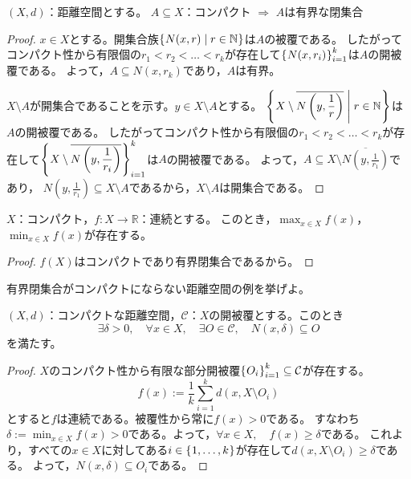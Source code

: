 \documentclass[uplatex]{jsarticle}
\begin{document}
\begin{hodai}
  $(X, d)$：距離空間とする。
  $A \subseteq X$：コンパクト $\Longrightarrow$ $A$は有界な閉集合
\end{hodai}

\begin{proof}
   $x \in X$とする。開集合族$\Set{\hspace{-1.8pt} N(x,r) | r \in \mathbb{N} \hspace{-1.8pt}}$は$A$の被覆である。
  したがってコンパクト性から有限個の$r_{1} < r_{2} < \dots < r_{k}$が存在して$\Set{\hspace{-1.8pt} N(x,r_{i}) \hspace{-1.8pt}}_{i=1}^{k}$は$A$の開被覆である。
  よって，$A \subseteq N(x,r_{k})$であり，$A$は有界。

   $X \setminus A$が開集合であることを示す。$y \in X \setminus A$とする。
  ${\displaystyle \Set{\hspace{-1.8pt} X \setminus \overline{N \left( y, \frac{1}{r} \right)} | r \in \mathbb{N} \hspace{-1.8pt}}}$は$A$の開被覆である。
  したがってコンパクト性から有限個の$r_{1} < r_{2} < \dots < r_{k}$が存在して${\displaystyle \Set{\hspace{-1.8pt} X \setminus \overline{N \left( y,\frac{1}{r_{i}} \right)} \hspace{-1.8pt}}_{i=1}^{k}}$は$A$の開被覆である。
  よって，${\displaystyle A \subseteq X \setminus \overline{N \left( y,\frac{1}{r_{1}} \right)}}$であり，
  ${\displaystyle N \left( y, \frac{1}{r_{1}} \right) \subseteq X \setminus A}$であるから，$X \setminus A$は開集合である。
\end{proof}

\begin{corr}
  $X$：コンパクト，$f \colon X \longrightarrow \mathbb{R}$：連続とする。
  このとき，${\displaystyle \max_{x \in X} f(x)}$，${\displaystyle \min_{x \in X} f(x)}$が存在する。
\end{corr}

\begin{proof}
  $f(X)$はコンパクトであり有界閉集合であるから。
\end{proof}

 有界閉集合がコンパクトにならない距離空間の例を挙げよ。

\begin{hodai}[Lebesgue数の補題]
  $(X,d)$：コンパクトな距離空間，$\mathcal{C}$：$X$の開被覆とする。このとき
  \begin{equation}
    \exists \delta > 0, \quad \forall x \in X, \quad \exists O \in \mathcal{C}, \quad N(x, \delta) \subseteq O
  \end{equation}
  を満たす。
\end{hodai}

\begin{proof}
  $X$のコンパクト性から有限な部分開被覆$\Set{\hspace{-1.8pt} O_{i} \hspace{-1.8pt}}_{i=1}^{k} \subseteq \mathcal{C}$が存在する。
  \begin{equation}
    f(x) := \frac{1}{k} \sum_{i=1}^{k} d(x, X \setminus O_{i})
  \end{equation}
  とすると$f$は連続である。被覆性から常に$f(x) > 0$である。
  すなわち${\displaystyle \delta := \min_{x \in X} f(x) > 0}$である。よって，$\forall x \in X, \quad f(x) \ge \delta$である。
  これより，すべての$x \in X$に対してある$i \in \Set{\hspace{-1.8pt} 1,\dots,k \hspace{-1.8pt}}$が存在して$d(x, X \setminus O_{i}) \ge \delta$である。
  よって，$N(x, \delta) \subseteq O_{i}$である。
\end{proof}
\end{document}

